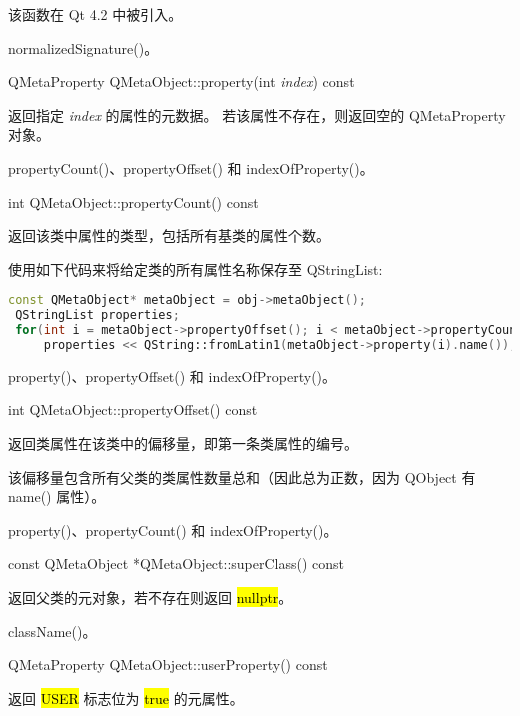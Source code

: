 
该函数在 Qt 4.2 中被引入。

\begin{seeAlso}
normalizedSignature()。
\end{seeAlso}

QMetaProperty QMetaObject::property(int \emph{index}) const

返回指定 \emph{index} 的属性的元数据。
若该属性不存在，则返回空的 QMetaProperty 对象。

\begin{seeAlso}
propertyCount()、propertyOffset() 和 indexOfProperty()。
\end{seeAlso}

int QMetaObject::propertyCount() const

返回该类中属性的类型，包括所有基类的属性个数。

使用如下代码来将给定类的所有属性名称保存至 QStringList: 

\begin{lstlisting}[language=C++]
 const QMetaObject* metaObject = obj->metaObject();
 QStringList properties;
 for(int i = metaObject->propertyOffset(); i < metaObject->propertyCount(); ++i)
     properties << QString::fromLatin1(metaObject->property(i).name());
\end{lstlisting}

\begin{seeAlso}
property()、propertyOffset() 和 indexOfProperty()。
\end{seeAlso}

int QMetaObject::propertyOffset() const

返回类属性在该类中的偏移量，即第一条类属性的编号。

该偏移量包含所有父类的类属性数量总和（因此总为正数，因为 QObject 有 name() 属性）。

\begin{seeAlso}
property()、propertyCount() 和 indexOfProperty()。
\end{seeAlso}

const QMetaObject *QMetaObject::superClass() const

返回父类的元对象，若不存在则返回 \hl{nullptr}。

\begin{seeAlso}
className()。
\end{seeAlso}

QMetaProperty QMetaObject::userProperty() const

返回 \hl{USER} 标志位为 \hl{true} 的元属性。

